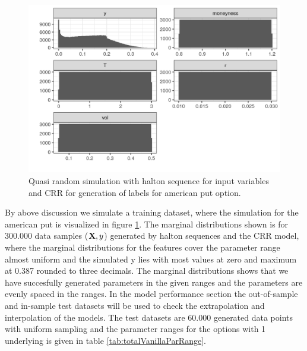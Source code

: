 \begin{figure}[th]
\centering
\includegraphics{Figures/marginalAmerPut.png}
\decoRule
\caption[Marginal Distributions For American Put]{Quasi random simulation with halton sequence for input variables and CRR for generation of labels for american put option.}
\label{fig:marginalAmerPut}
\end{figure}

By above discussion we simulate a training dataset, where the simulation for the american put is visualized in figure \ref{fig:marginalAmerPut}. The marginal distributions shown is for $300.000$ data samples ($\mathbf{X},y$) generated by halton sequences and the CRR model, where the marginal distributions for the features cover the parameter range almost uniform and the simulated y lies with most values at zero and maximum at 0.387 rounded to three decimals. The marginal distributions shows that we have succesfully generated parameters in the given ranges and the parameters are evenly spaced in the ranges. In the model performance section the out-of-sample and in-sample test datasets will be used to check the extrapolation and interpolation of the models. The test datasets are 60.000 generated data points with uniform sampling and the parameter ranges for the options with 1 underlying is given in table \ref{tab:totalVanillaParRange}.


